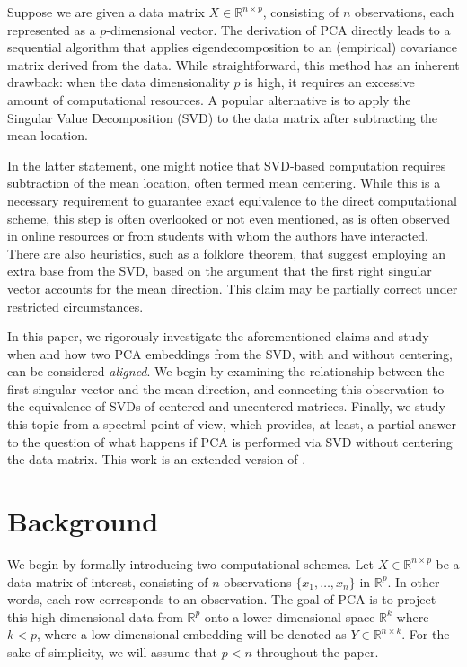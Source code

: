 \documentclass[11pt]{article}
\newcommand{\bbR}{\mathbb{R}}
\begin{document}
Suppose we are given a data matrix $X \in \bbR^{n\times p}$, consisting of $n$ observations, each represented as a $p$-dimensional vector. The derivation of PCA directly leads to a sequential algorithm that applies eigendecomposition to an (empirical) covariance matrix derived from the data. While straightforward, this method has an inherent drawback: when the data dimensionality $p$ is high, it requires an excessive amount of computational resources. A popular alternative is to apply the Singular Value Decomposition (SVD) to the data matrix after subtracting the mean location.

In the latter statement, one might notice that SVD-based computation requires subtraction of the mean location, often termed mean centering. While this is a necessary requirement to guarantee exact equivalence to the direct computational scheme, this step is often overlooked or not even mentioned, as is often observed in online resources or from students with whom the authors have interacted. There are also heuristics, such as a folklore theorem, that suggest employing an extra base from the SVD, based on the argument that the first right singular vector accounts for the mean direction. This claim may be partially correct under restricted circumstances.


In this paper, we rigorously investigate the aforementioned claims and study when and how two PCA embeddings from the SVD, with and without centering, can be considered \textit{aligned}. We begin by examining the relationship between the first singular vector and the mean direction, and connecting this observation to the equivalence of SVDs of centered and uncentered matrices. Finally, we study this topic from a spectral point of view, which provides, at least, a partial answer to the question of what happens if PCA is performed via SVD without centering the data matrix. This work is an extended version of \cite{kimPeriodicSignalAnalysis2015}.






\section{Background}\label{sec:twoschemes}

We begin by formally introducing two computational schemes. Let $X\in\bbR^{n\times p}$ be a data matrix of interest, consisting of $n$ observations $\lbrace x_1, \ldots, x_n\rbrace $ in $\bbR^p$. In other words, each row corresponds to an observation. The goal of PCA is to project this high-dimensional data from $\bbR^p$ onto a lower-dimensional space $\bbR^k$ where $k<p$, where a low-dimensional embedding will be denoted as $Y \in \bbR^{n\times k}$. For the sake of simplicity, we will assume that $p < n$ throughout the paper.
\end{document}
